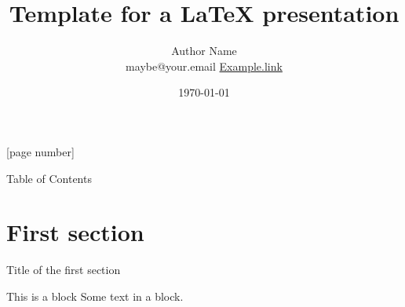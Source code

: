\documentclass[12pt]{beamer}
\begin{document}

\author{Author Name \\ maybe@your.email
	\hfill 	\href{https://example.com}{Example.link}}
\title{Template for a {\LaTeX} presentation}
\date{\today} %

[page number]


\begin{frame}[plain]
	\maketitle
\end{frame}


\begin{frame}{Table of Contents}
	\tableofcontents
\end{frame}

\section{First section}

\begin{frame}{Title of the first section}
	\begin{block}{This is a block}
		Some text in a block.
	\end{block}
\end{frame}
\end{document}
